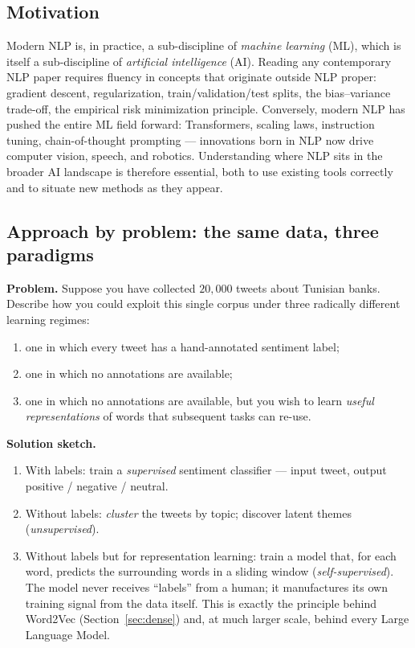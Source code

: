 \documentclass[12pt,a4paper]{report}
\theoremstyle{definition}
\theoremstyle{remark}
\begin{document}
\subsection{Motivation}
Modern NLP is, in practice, a sub-discipline of \emph{machine learning} (ML), which is itself a sub-discipline of \emph{artificial intelligence} (AI). Reading any contemporary NLP paper requires fluency in concepts that originate outside NLP proper: gradient descent, regularization, train/validation/test splits, the bias--variance trade-off, the empirical risk minimization principle. Conversely, modern NLP has pushed the entire ML field forward: Transformers, scaling laws, instruction tuning, chain-of-thought prompting --- innovations born in NLP now drive computer vision, speech, and robotics. Understanding where NLP sits in the broader AI landscape is therefore essential, both to use existing tools correctly and to situate new methods as they appear.

\subsection{Approach by problem: the same data, three paradigms}
\textbf{Problem.} Suppose you have collected $20{,}000$ tweets about Tunisian banks. Describe how you could exploit this single corpus under three radically different learning regimes:
\begin{enumerate}
    \item one in which every tweet has a hand-annotated sentiment label;
    \item one in which no annotations are available;
    \item one in which no annotations are available, but you wish to learn \emph{useful representations} of words that subsequent tasks can re-use.
\end{enumerate}

\textbf{Solution sketch.}
\begin{enumerate}
    \item With labels: train a \emph{supervised} sentiment classifier --- input tweet, output positive / negative / neutral.
    \item Without labels: \emph{cluster} the tweets by topic; discover latent themes (\emph{unsupervised}).
    \item Without labels but for representation learning: train a model that, for each word, predicts the surrounding words in a sliding window (\emph{self-supervised}). The model never receives ``labels'' from a human; it manufactures its own training signal from the data itself. This is exactly the principle behind Word2Vec (Section~\ref{sec:dense}) and, at much larger scale, behind every Large Language Model.
\end{enumerate}
\end{document}
